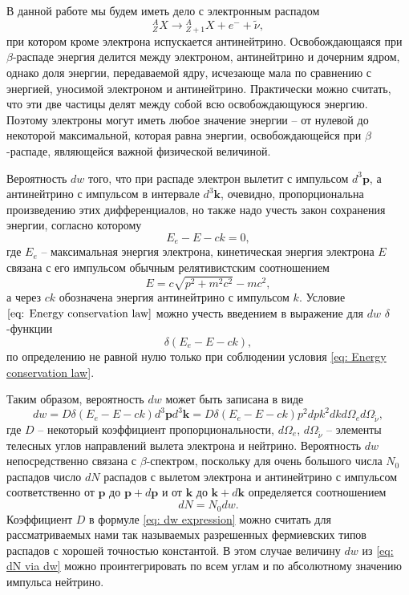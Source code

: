 \documentclass[a4paper,12pt]{article}
\begin{document}
В данной работе мы будем иметь дело с электронным распадом
\begin{equation}\label{eq: decay scheme}
    {}_{Z}^{A}X \xrightarrow{} {}_{Z+1}^{A}X + e^{-} + \widetilde\nu,
\end{equation}
при котором кроме электрона испускается антинейтрино. Освобождающаяся при $\beta$-распаде энергия делится между электроном, антинейтрино
и дочерним ядром, однако доля энергии, передаваемой ядру, исчезающе мала по сравнению с энергией, уносимой электроном и антинейтрино. Практически можно считать, что эти две частицы делят между собой всю освобождающуюся энергию. Поэтому электроны могут иметь любое значение энергии -- от нулевой до некоторой максимальной, которая равна энергии, освобождающейся при $\beta$-распаде, являющейся важной физической величиной.

Вероятность $dw$ того, что при распаде электрон вылетит с импульсом $d^3\mathbf{p}$, а антинейтрино с импульсом в интервале $d^3\mathbf{k}$, очевидно, пропорциональна произведению этих дифференциалов, но также надо учесть закон сохранения энергии, согласно которому
\begin{equation}\label{eq: Energy conservation law}
    E_e - E - ck = 0,
\end{equation}
где $E_e$ -- максимальная энергия электрона, кинетическая энергия электрона $E$ связана с его импульсом обычным релятивистским соотношением
\begin{equation}\label{eq: Energy expression}
    E = c\sqrt{p^2 + m^2c^2} - mc^2,
\end{equation}
а через $ck$ обозначена энергия антинейтрино с импульсом $k$. Условие $\eqref{eq: Energy conservation law}$ можно учесть введением в выражение для $dw$ $\delta$-функции
\begin{equation}\label{eq: delta function expression}
    \delta(E_e - E - ck),
\end{equation}
по определению не равной нулю только при соблюдении условия \eqref{eq: Energy conservation law}.

Таким образом, вероятность $dw$ может быть записана в виде
\begin{equation}\label{eq: dw expression}
    dw = D\delta(E_e - E - ck)d^3\mathbf{p}d^3\mathbf{k} = D\delta(E_e - E - ck)p^2dpk^2dk d\Omega_e d\Omega_{\widetilde\nu},
\end{equation}
где $D$ -- некоторый коэффициент пропорциональности, $d\Omega_e$, $d\Omega_{\widetilde\nu}$ -- элементы телесных углов направлений вылета электрона и нейтрино. Вероятность $dw$ непосредственно связана с $\beta$-спектром, поскольку для очень большого числа $N_0$ распадов число $dN$ распадов с вылетом электрона и антинейтрино с импульсом соответственно от $\mathbf{p}$ до $\mathbf{p} + d\mathbf{p}$ и от $\mathbf{k}$ до $\mathbf{k} + d\mathbf{k}$ определяется соотношением 
\begin{equation}\label{eq: dN via dw}
    dN = N_0 dw.
\end{equation}
Коэффициент $D$ в формуле \eqref{eq: dw expression} можно считать для рассматриваемых нами так называемых разрешенных фермиевских типов распадов с хорошей точностью константой. В этом случае величину $dw$ из \eqref{eq: dN via dw} можно проинтегрировать по всем углам и по абсолютному значению импульса нейтрино.
\end{document}
